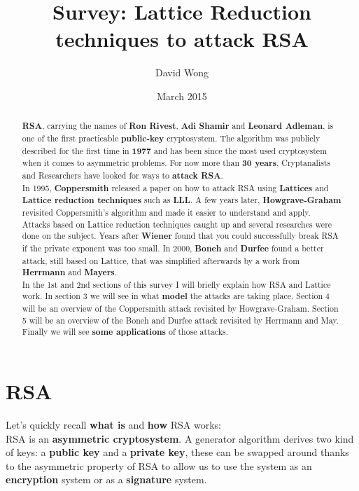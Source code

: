\documentclass[a4paper,11pt]{article}
\title{Survey: Lattice Reduction techniques to attack RSA}
\author{David Wong}
\date{March 2015}
\begin{document}
\maketitle

\begin{abstract}
\textbf{RSA}, carrying the names of \textbf{Ron Rivest}, \textbf{Adi Shamir} and \textbf{Leonard Adleman}, is one of the first practicable \textbf{public-key} cryptosystem. The algorithm was publicly described for the first time in \textbf{1977} and has been since the most used cryptosystem when it comes to asymmetric problems. For now more than \textbf{30 years}, Cryptanalists and Researchers have looked for ways to \textbf{attack RSA}.\\
In 1995, \textbf{Coppersmith} released a paper on how to attack RSA using \textbf{Lattices} and \textbf{Lattice reduction techniques} such as \textbf{LLL}. A few years later, \textbf{Howgrave-Graham} revisited Coppersmith's algorithm and made it easier to understand and apply.\\
Attacks based on Lattice reduction techniques caught up and several researches were done on the subject. Years after \textbf{Wiener} found that you could successfully break RSA if the private exponent was too small. In 2000, \textbf{Boneh} and \textbf{Durfee} found a better attack, still based on Lattice, that was simplified afterwards by a work from \textbf{Herrmann} and \textbf{Mayers}.\\
In the 1st and 2nd sections of this survey I will briefly explain how RSA and Lattice work. In section 3 we will see in what \textbf{model} the attacks are taking place. Section 4 will be an overview of the Coppersmith attack revisited by Howgrave-Graham. Section 5 will be an overview of the Boneh and Durfee attack revisited by Herrmann and May. Finally we will see \textbf{some applications} of those attacks.
\end{abstract}

\newpage

\section{RSA}\label{rsa}

Let's quickly recall \textbf{what is} and \textbf{how} RSA works:\\
RSA is an \textbf{asymmetric cryptosystem}. A generator algorithm derives two kind of keys: a \textbf{public key} and a \textbf{private key}, these can be swapped around thanks to the asymmetric property of RSA to allow us to use the system as an \textbf{encryption} system or as a \textbf{signature} system.\\
\end{document}
